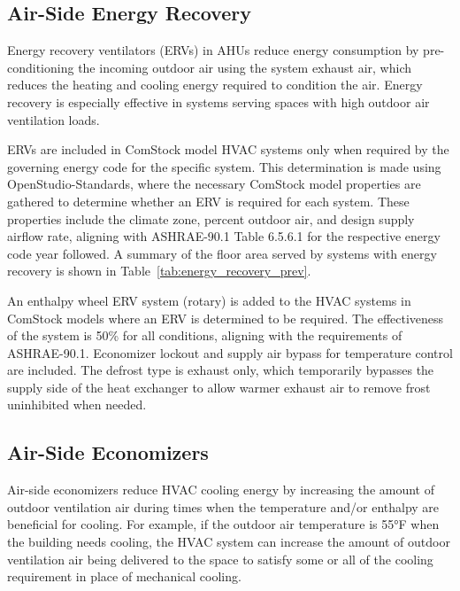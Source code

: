 \subsection{Air-Side Energy Recovery}
\label{sec:erv}

Energy recovery ventilators (ERVs) in AHUs reduce energy consumption by pre-conditioning the incoming outdoor air using the system exhaust air, which reduces the heating and cooling energy required to condition the air. Energy recovery is especially effective in systems serving spaces with high outdoor air ventilation loads.

ERVs are included in ComStock model HVAC systems only when required by the governing energy code for the specific system. This determination is made using OpenStudio-Standards, where the necessary ComStock model properties are gathered to determine whether an ERV is required for each system. These properties include the climate zone, percent outdoor air, and design supply airflow rate, aligning with ASHRAE-90.1 Table 6.5.6.1 for the respective energy code year followed. A summary of the floor area served by systems with energy recovery is shown in Table~\ref{tab:energy_recovery_prev}.




An enthalpy wheel ERV system (rotary) is added to the HVAC systems in ComStock models where an ERV is determined to be required. The effectiveness of the system is 50\% for all conditions, aligning with the requirements of ASHRAE-90.1. Economizer lockout and supply air bypass for temperature control are included. The defrost type is exhaust only, which temporarily bypasses the supply side of the heat exchanger to allow warmer exhaust air to remove frost uninhibited when needed.

\subsection{Air-Side Economizers}

Air-side economizers reduce HVAC cooling energy by increasing the amount of outdoor ventilation air during times when the temperature and/or enthalpy are beneficial for cooling. For example, if the outdoor air temperature is 55°F when the building needs cooling, the HVAC system can increase the amount of outdoor ventilation air being delivered to the space to satisfy some or all of the cooling requirement in place of mechanical cooling.

